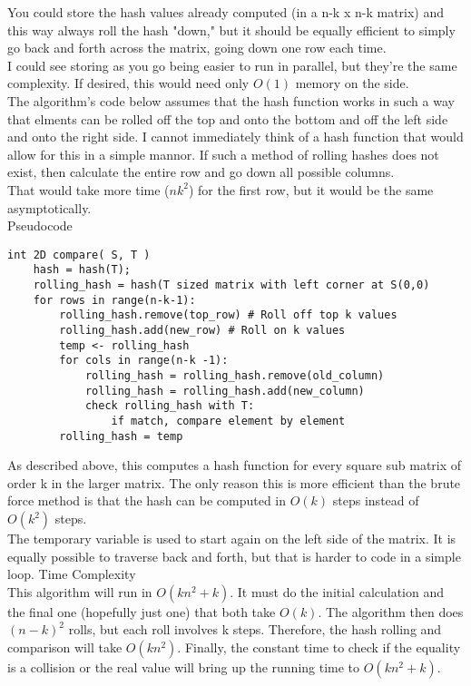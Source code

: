 \documentclass[12pt,twoside]{article}
\begin{document}
\begin{problems}
\begin{problemparts}
You could store the hash values already computed (in a n-k x n-k matrix) and this way always roll the hash "down," but it should be equally efficient to simply go back and forth across the matrix, going down one row each time.\\

I could see storing as you go being easier to run in parallel, but they're the same complexity.  If desired, this would need only $O(1)$ memory on the side.\\

The algorithm's code below assumes that the hash function works in such a way that elments can be rolled off the top and onto the bottom and off the left side and onto the right side.  I cannot immediately think of a hash function that would allow for this in a simple mannor.  If such a method of rolling hashes does not exist, then calculate the entire row and go down all possible columns.\\  

That would take more time ($nk^2$) for the first row, but it would be the same asymptotically.\\

\problempart Pseudocode\\
\begin{lstlisting}
int 2D compare( S, T )
	hash = hash(T);
	rolling_hash = hash(T sized matrix with left corner at S(0,0)
	for rows in range(n-k-1):
		rolling_hash.remove(top_row) # Roll off top k values
		rolling_hash.add(new_row) # Roll on k values
		temp <- rolling_hash
		for cols in range(n-k -1):
			rolling_hash = rolling_hash.remove(old_column)
			rolling_hash = rolling_hash.add(new_column)
			check rolling_hash with T:
				if match, compare element by element
		rolling_hash = temp
\end{lstlisting}

As described above, this computes a hash function for every square sub matrix of order k in the larger matrix.  The only reason this is more efficient than the brute force method is that the hash can be computed in $O(k)$ steps instead of $O(k^2)$ steps.\\

The temporary variable is used to start again on the left side of the matrix.  It is equally possible to traverse back and forth, but that is harder to code in a simple loop.
\problempart Time Complexity \\
This algorithm will run in $O(kn^2 + k)$.  It must do the initial calculation and the final one (hopefully just one) that both take $O(k)$.  The algorithm then does $(n-k)^2$ rolls, but each roll involves k steps.  Therefore, the hash rolling and comparison will take $O(kn^2)$.  Finally, the constant time to check if the equality is a collision or the real value will bring up the running time to $O(kn^2 + k)$.\\  


\end{problemparts}
\end{problems}
\end{document}
